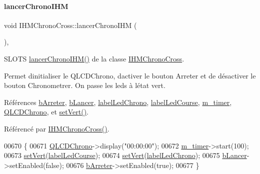 \paragraph{\texorpdfstring{lancer\+Chrono\+I\+HM}{lancerChronoIHM}}
{\footnotesize\ttfamily void I\+H\+M\+Chrono\+Cross\+::lancer\+Chrono\+I\+HM (\begin{DoxyParamCaption}{ }\end{DoxyParamCaption})\hspace{0.3cm}{\ttfamily [private]}, {\ttfamily [slot]}}



S\+L\+O\+TS \hyperlink{class_i_h_m_chrono_cross_a0e78f2d4d5e46c4551fc4517614a56d8}{lancer\+Chrono\+I\+H\+M()} de la classe \hyperlink{class_i_h_m_chrono_cross}{I\+H\+M\+Chrono\+Cross}. 

Permet d\textquotesingle{}initialiser le Q\+L\+C\+D\+Chrono, d\textquotesingle{}activer le bouton Arreter et de désactiver le bouton Chronometrer. On passe les leds à l\textquotesingle{}état vert. 

Références \hyperlink{class_i_h_m_chrono_cross_a75ce4fcdab11095834fe3f9e931f8964}{b\+Arreter}, \hyperlink{class_i_h_m_chrono_cross_a1b0a7c5e58d6a9f873cdc912d67b8de9}{b\+Lancer}, \hyperlink{class_i_h_m_chrono_cross_ad43bab2d9a06fe2fb198c56d8b9faab2}{label\+Led\+Chrono}, \hyperlink{class_i_h_m_chrono_cross_a8568c80f2e2ffe96c81d2a94a2146159}{label\+Led\+Course}, \hyperlink{class_i_h_m_chrono_cross_ad29ebde513a6e722cf87aa06e767416a}{m\+\_\+timer}, \hyperlink{class_i_h_m_chrono_cross_a6169c1483faab14d1f619d1d838c198e}{Q\+L\+C\+D\+Chrono}, et \hyperlink{class_i_h_m_chrono_cross_aba2b1a136332baa7bd4905f9af15705b}{set\+Vert()}.



Référencé par \hyperlink{class_i_h_m_chrono_cross_a479fc90733fba3e65fb06aa4a3adc02e}{I\+H\+M\+Chrono\+Cross()}.


\begin{DoxyCode}
00670 \{
00671     \hyperlink{class_i_h_m_chrono_cross_a6169c1483faab14d1f619d1d838c198e}{QLCDChrono}->display(\textcolor{stringliteral}{"00:00:00"});
00672     \hyperlink{class_i_h_m_chrono_cross_ad29ebde513a6e722cf87aa06e767416a}{m\_timer}->start(100);
00673     \hyperlink{class_i_h_m_chrono_cross_aba2b1a136332baa7bd4905f9af15705b}{setVert}(\hyperlink{class_i_h_m_chrono_cross_a8568c80f2e2ffe96c81d2a94a2146159}{labelLedCourse});
00674     \hyperlink{class_i_h_m_chrono_cross_aba2b1a136332baa7bd4905f9af15705b}{setVert}(\hyperlink{class_i_h_m_chrono_cross_ad43bab2d9a06fe2fb198c56d8b9faab2}{labelLedChrono});
00675     \hyperlink{class_i_h_m_chrono_cross_a1b0a7c5e58d6a9f873cdc912d67b8de9}{bLancer}->setEnabled(\textcolor{keyword}{false});
00676     \hyperlink{class_i_h_m_chrono_cross_a75ce4fcdab11095834fe3f9e931f8964}{bArreter}->setEnabled(\textcolor{keyword}{true});
00677 \}
\end{DoxyCode}
\mbox{\label{class_i_h_m_chrono_cross_ace90922ce4c4ffeed6f1e8eb84c8c7a5}} 
